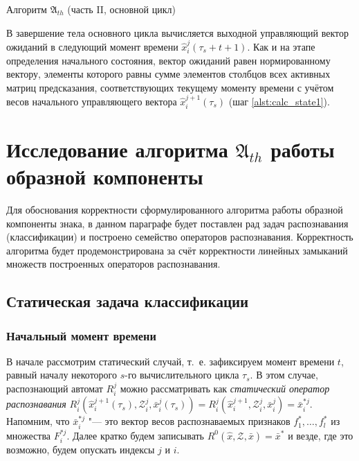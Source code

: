 \begin{algorithm}[h]
	\caption{Алгоритм $\mathfrak{A}_{th}$ (часть II, основной цикл)}\label{alg:th_cycle}
	\begin{algorithmic}[1]
		
	\end{algorithmic}
\end{algorithm}
		
В завершение тела основного цикла вычисляется выходной управляющий вектор ожиданий в следующий момент времени $\hat x_i^j(\tau_s+t+1)$. Как и на этапе определения начального состояния, вектор ожиданий равен нормированному вектору, элементы которого равны сумме элементов столбцов всех активных матриц предсказания, соответствующих текущему моменту времени с учётом весов начального управляющего вектора $\hat x_i^{j+1}(\tau_s)$ (шаг \ref{alst:calc_state1}).

\section{Исследование алгоритма $\mathfrak A_{th}$ работы образной компоненты}\label{sect3_2}

Для обоснования корректности сформулированного алгоритма работы образной компоненты знака, в данном параграфе будет поставлен рад задач распознавания (классификации) и построено семейство операторов распознавания. Корректность алгоритма будет продемонстрирована за счёт корректности линейных замыканий множеств построенных операторов распознавания.

\subsection{Статическая задача классификации}

\subsubsection{Начальный момент времени}
В начале рассмотрим статический случай, т.~е. зафиксируем момент времени $t$, равный началу некоторого $s$-го вычислительного цикла $\tau_s$. В этом случае, распознающий автомат $R_i^j$ можно рассматривать как \textit{статический оператор распознавания} $R_i^j(\hat x_i^{j+1}(\tau_s),\mathcal Z_i^j,\bar x_i^j(\tau_s))=R_i^j(\hat x_i^{j+1},\mathcal Z_i^j,\bar x_i^j)=\bar{x}_i^{*j}$. Напомним, что $\bar{x}_i^{*j}$ "--- это вектор весов распознаваемых признаков $f_1^*,\dots,f_l^*$ из множества $F_i^{*j}$. Далее кратко будем записывать $R^0(\hat{x},\mathcal{Z},\bar{x})=\bar{x}^*$ и везде, где это возможно, будем опускать индексы $j$ и $i$.
	
